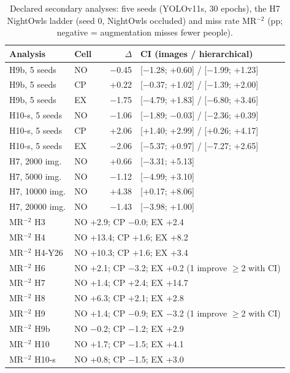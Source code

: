 \begin{table}[H]\centering\scriptsize
\caption{Declared secondary analyses: five seeds (YOLOv11s, 30 epochs), the H7 NightOwls ladder (seed 0, NightOwls occluded) and miss rate MR$^{-2}$ (pp; negative = augmentation misses fewer people).}\label{tab:s-extra}
\setlength{\tabcolsep}{2.5pt}\begin{tabular}{@{}l l r l@{}}\toprule
Analysis & Cell & $\Delta$ & CI (images / hierarchical) \\
\midrule
H9b, 5 seeds & NO & $-$0.45 & [$-$1.28; +0.60] / [$-$1.99; +1.23] \\
H9b, 5 seeds & CP & +0.22 & [$-$0.37; +1.02] / [$-$1.39; +2.00] \\
H9b, 5 seeds & EX & $-$1.75 & [$-$4.79; +1.83] / [$-$6.80; +3.46] \\
H10-s, 5 seeds & NO & $-$1.06 & [$-$1.89; $-$0.03] / [$-$2.36; +0.39] \\
H10-s, 5 seeds & CP & +2.06 & [+1.40; +2.99] / [+0.26; +4.17] \\
H10-s, 5 seeds & EX & $-$2.06 & [$-$5.37; +0.97] / [$-$7.27; +2.65] \\
\midrule
H7, 2000 img. & NO & +0.66 & [$-$3.31; +5.13] \\
H7, 5000 img. & NO & $-$1.12 & [$-$4.99; +3.10] \\
H7, 10000 img. & NO & +4.38 & [+0.17; +8.06] \\
H7, 20000 img. & NO & $-$1.43 & [$-$3.98; +1.00] \\
\midrule
MR$^{-2}$ H3 & \multicolumn{3}{l}{NO +2.9; CP $-$0.0; EX +2.4} \\
MR$^{-2}$ H4 & \multicolumn{3}{l}{NO +13.4; CP +1.6; EX +8.2} \\
MR$^{-2}$ H4-Y26 & \multicolumn{3}{l}{NO +10.3; CP +1.6; EX +3.4} \\
MR$^{-2}$ H6 & \multicolumn{3}{l}{NO +2.1; CP $-$3.2; EX +0.2 (1 improve $\geq$2 with CI)} \\
MR$^{-2}$ H7 & \multicolumn{3}{l}{NO +1.4; CP +2.4; EX +14.7} \\
MR$^{-2}$ H8 & \multicolumn{3}{l}{NO +6.3; CP +2.1; EX +2.8} \\
MR$^{-2}$ H9 & \multicolumn{3}{l}{NO +1.4; CP $-$0.9; EX $-$3.2 (1 improve $\geq$2 with CI)} \\
MR$^{-2}$ H9b & \multicolumn{3}{l}{NO $-$0.2; CP $-$1.2; EX +2.9} \\
MR$^{-2}$ H10 & \multicolumn{3}{l}{NO +1.7; CP $-$1.5; EX +4.1} \\
MR$^{-2}$ H10-s & \multicolumn{3}{l}{NO +0.8; CP $-$1.5; EX +3.0} \\

\end{tabular}
\end{table}
